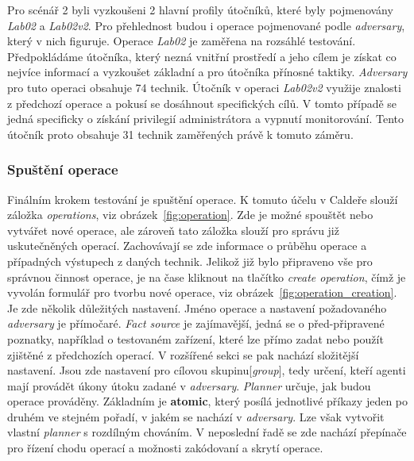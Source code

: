 Pro scénář 2 byli vyzkoušeni 2 hlavní profily útočníků, které byly pojmenovány \textit{Lab02} a \textit{Lab02v2}.
Pro přehlednost budou i operace pojmenované podle \textit{adversary}, který v nich figuruje.
Operace \textit{Lab02} je zaměřena na rozsáhlé testování.
Předpokládáme útočníka, který nezná vnitřní prostředí a jeho cílem je získat co nejvíce informací a vyzkoušet základní a pro útočníka přínosné taktiky.
\textit{Adversary} pro tuto operaci obsahuje 74 technik.
Útočník v operaci \textit{Lab02v2} využije znalosti z předchozí operace a pokusí se dosáhnout specifických cílů.
V tomto případě se jedná specificky o získání privilegií administrátora a vypnutí monitorování.
Tento útočník proto obsahuje 31 technik zaměřených právě k tomuto záměru.


\subsubsection{Spuštění operace}
Finálním krokem testování je spuštění operace.
K tomuto účelu v Caldeře slouží záložka \textit{operations}, viz obrázek~\ref{fig:operation}.
Zde je možné spouštět nebo vytvářet nové operace, ale zároveň tato záložka slouží pro správu již uskutečněných operací.
Zachovávají se zde informace o průběhu operace a případných výstupech z daných technik.
Jelikož již bylo připraveno vše pro správnou činnost operace, je na čase kliknout na tlačítko \textit{create operation}, čímž je vyvolán formulář pro tvorbu nové operace, viz obrázek~\ref{fig:operation_creation}.
Je zde několik důležitých nastavení.
Jméno operace a nastavení požadovaného \textit{adversary} je přímočaré.
\textit{Fact source} je zajímavější, jedná se o před-připravené poznatky, například o testovaném zařízení, které lze přímo zadat nebo použít zjištěné z předchozích operací.
V rozšířené sekci se pak nachází složitější nastavení.
Jsou zde nastavení pro cílovou skupinu[\textit{group}], tedy určení, kteří agenti mají provádět úkony útoku zadané v \textit{adversary}.
\textit{Planner} určuje, jak budou operace prováděny.
Základním je \textbf{atomic}, který posílá jednotlivé příkazy jeden po druhém ve stejném pořadí, v jakém se nachází v \textit{adversary}.
Lze však vytvořit vlastní \textit{planner} s rozdílným chováním\cite{mitre_caldera_docs}.
V neposlední řadě se zde nachází přepínače pro řízení chodu operací a možnosti zakódovaní a skrytí operace.

